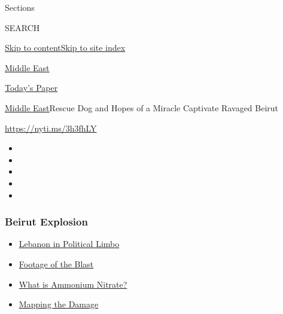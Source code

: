 Sections

SEARCH

\protect\hyperlink{site-content}{Skip to
content}\protect\hyperlink{site-index}{Skip to site index}

\href{https://www.nytimes3xbfgragh.onion/section/world/middleeast}{Middle
East}

\href{https://myaccount.nytimes3xbfgragh.onion/auth/login?response_type=cookie\&client_id=vi}{}

\href{https://www.nytimes3xbfgragh.onion/section/todayspaper}{Today's
Paper}

\href{/section/world/middleeast}{Middle East}\textbar{}Rescue Dog and
Hopes of a Miracle Captivate Ravaged Beirut

\url{https://nyti.ms/3h3fhLY}

\begin{itemize}
\item
\item
\item
\item
\item
\end{itemize}

\hypertarget{beirut-explosion}{%
\subsubsection{Beirut Explosion}\label{beirut-explosion}}

\begin{itemize}
\tightlist
\item
  \href{https://www.nytimes3xbfgragh.onion/2020/08/11/world/middleeast/lebanon-government-resigns-explainer.html?name=styln-beirut\&region=TOP_BANNER\&block=storyline_menu_recirc\&action=click\&pgtype=Article\&impression_id=fed4d540-f2cd-11ea-8b78-5953de45aae8\&variant=undefined}{Lebanon
  in Political Limbo}
\item
  \href{https://www.nytimes3xbfgragh.onion/2020/08/05/world/middleeast/beirut-explosion-footage.html?name=styln-beirut\&region=TOP_BANNER\&block=storyline_menu_recirc\&action=click\&pgtype=Article\&impression_id=fed4d541-f2cd-11ea-8b78-5953de45aae8\&variant=undefined}{Footage
  of the Blast}
\item
  \href{https://www.nytimes3xbfgragh.onion/2020/08/05/world/middleeast/beirut-explosion-ammonium-nitrate.html?name=styln-beirut\&region=TOP_BANNER\&block=storyline_menu_recirc\&action=click\&pgtype=Article\&impression_id=fed4d542-f2cd-11ea-8b78-5953de45aae8\&variant=undefined}{What
  is Ammonium Nitrate?}
\item
  \href{https://www.nytimes3xbfgragh.onion/interactive/2020/08/04/world/middleeast/beirut-explosion-damage.html?name=styln-beirut\&region=TOP_BANNER\&block=storyline_menu_recirc\&action=click\&pgtype=Article\&impression_id=fed4d543-f2cd-11ea-8b78-5953de45aae8\&variant=undefined}{Mapping
  the Damage}
\end{itemize}

